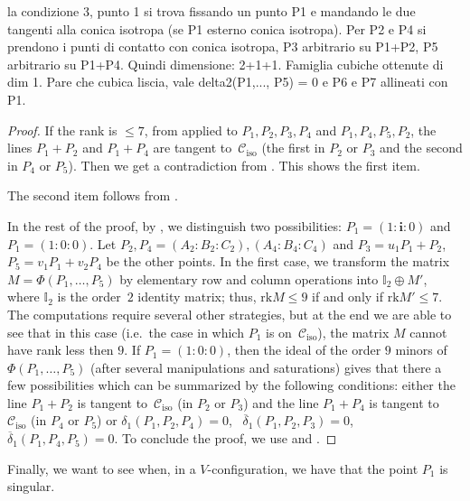 \documentclass[11pt, a4paper, reqno, captions=tableheading,bibliography=totoc]{scrartcl}
\theoremstyle{plain}
\theoremstyle{definition}
\newcommand{\iso}{\mathcal{C}_{\mathrm{iso}}}
\newcommand{\iii}{\textbf{i}}
\newcommand{\rk}{\ensuremath{\mathrm{rk}}}
\begin{document}
la condizione 3, punto 1 si trova fissando un punto P1 e mandando le due
tangenti alla conica isotropa (se P1 esterno conica isotropa). Per P2 e P4 si prendono i punti di contatto con conica isotropa, P3 arbitrario su P1+P2, P5 arbitrario su P1+P4. Quindi dimensione: 2+1+1. Famiglia cubiche ottenute di dim 1. Pare che cubica liscia, vale delta2(P1,..., P5) = 0 e P6 e P7 allineati con P1.   
\begin{proof}
If the rank is $\leq 7$, from
 applied to $P_1, P_2, P_3, P_4$ and $P_1, P_4, P_5, P_2$,
the lines $P_1+P_2$ and $P_1 + P_4$ are tangent to~$\iso$ (the first in $P_2$ or $P_3$ and the second in $P_4$ or $P_5$).
Then we get a contradiction from .
This shows the first item.

The second item follows from .

In the rest of the proof, by , we distinguish two possibilities:
$P_1 = (1:\iii :0)$ and
$P_1 = (1: 0: 0)$.
Let $P_2, P_4 = (A_2: B_2: C_2), (A_4: B_4: C_4)$ and
$P_3 = u_1P_1+P_2$, $P_5 = v_1P_1+v_2P_4$ be the other points.
In the first case, we transform the matrix $M = \Phi(P_1, \dots, P_5)$ by elementary row and column operations into $\mathbb{I}_2 \oplus M'$, where $\mathbb{I}_2$ is the order~$2$ identity matrix; thus, $\rk  M \leq 9$ if and only if $\rk  M' \leq 7$.
The computations require several other strategies, but at the end we are
able to see that in this case (i.e.\ the case in which $P_1$ is on~$\iso$), the matrix $M$ cannot have rank less then $9$.
If $P_1 = (1: 0: 0)$, then the ideal of the order $9$ minors of
$\Phi(P_1, \dots, P_5)$ (after several manipulations and saturations)
gives that there a few possibilities which can be summarized by the
following conditions: either the line $P_1+P_2$ is tangent to~$\iso$ (in $P_2$ or $P_3$) and the line $P_1+P_4$ is tangent to~$\iso$ (in $P_4$ or $P_5$) or $\delta_1(P_1, P_2, P_4) = 0$,
\ $\overline{\delta}_1(P_1, P_2, P_3) = 0$,
\ $\overline{\delta}_1(P_1, P_4, P_5) = 0$.
To conclude the proof, we use  and .
\end{proof}

Finally, we want to see when, in a $V$-configuration, we have that the point
$P_1$ is singular.
\end{document}

